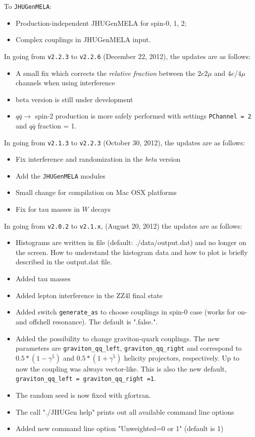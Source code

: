 \documentclass[aps,superscriptaddress,nofootinbib]{revtex4}
\begin{document}
To \verb|JHUGenMELA|:
\begin{itemize}
\item Production-independent JHUGenMELA for spin-0, 1, 2;
\item Complex couplings in JHUGenMELA input.
\end{itemize}
\noindent
In going from \verb|v2.2.3| to \verb|v2.2.6| (December 22, 2012), the updates are as follows:
\begin{itemize}
\item A small fix which corrects the {\it relative fraction} between the $2e2\mu$ and $4e$/$4\mu$ channels when using interference
\item beta version is still under development
\item $q\bar{q} \to$ spin-2 production is more safely performed with settings \verb|PChannel = 2| and $q\bar{q}$ fraction = 1.
\end{itemize}
\noindent
In going from \verb|v2.1.3| to \verb|v2.2.3| (October 30, 2012), the updates are as follows:
\begin{itemize}
\item Fix interference and randomization in the {\it{beta}} version
\item Add the \verb|JHUGenMELA| modules
\item Small change for compilation on Mac OSX platforms
\item Fix for tau masses in $W$ decays
\end{itemize}
\noindent
In going from \verb|v2.0.2| to \verb|v2.1.x|, (August 20, 2012) the updates are as follows:
\begin{itemize}
\item Histograms are written in file (default: ./data/output.dat) and no longer on the screen.  How to understand the histogram data and how to plot is briefly described in the output.dat file.
\item Added tau masses
\item Added lepton interference in the ZZ4l final state
\item Added switch \verb|generate_as| to choose couplings in spin-0 case (works for on- and offshell resonance). The default is ".false.".
\item Added the possibility to change graviton-quark couplings. The new parameters are \verb|graviton_qq_left|, \verb|graviton_qq_right| and correspond to $0.5*(1-\gamma^5)$ and $0.5*(1+\gamma^5)$ helicity projectors, respectively. Up to now the coupling was always vector-like. This is also the new default, \verb|graviton_qq_left = graviton_qq_right =1|.
\item The random seed is now fixed with gfortran.
\item The call "./JHUGen help" prints out all available command line options
\item Added new command line option "Unweighted=0 or 1" (default is 1)
\end{itemize}
\clearpage
\appendix
\end{document}
